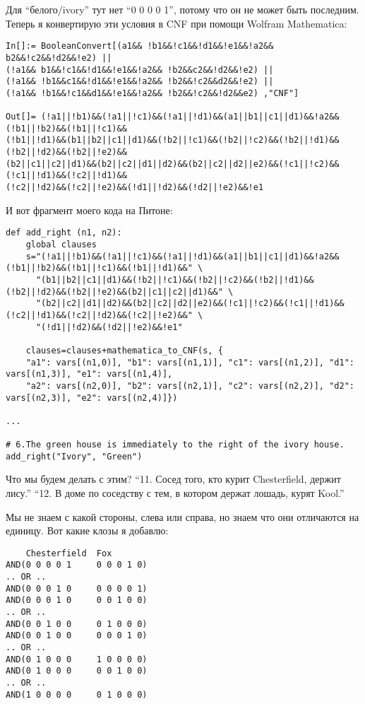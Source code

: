 Для ``белого/ivory'' тут нет ``0 0 0 0 1'', потому что он не может быть последним.
Теперь я конвертирую эти условия в CNF при помощи Wolfram Mathematica:

\begin{lstlisting}
In[]:= BooleanConvert[(a1&& !b1&&!c1&&!d1&&!e1&&!a2&& b2&&!c2&&!d2&&!e2) ||
(!a1&& b1&&!c1&&!d1&&!e1&&!a2&& !b2&&c2&&!d2&&!e2) ||
(!a1&& !b1&&c1&&!d1&&!e1&&!a2&& !b2&&!c2&&d2&&!e2) ||
(!a1&& !b1&&!c1&&d1&&!e1&&!a2&& !b2&&!c2&&!d2&&e2) ,"CNF"]

Out[]= (!a1||!b1)&&(!a1||!c1)&&(!a1||!d1)&&(a1||b1||c1||d1)&&!a2&&(!b1||!b2)&&(!b1||!c1)&&
(!b1||!d1)&&(b1||b2||c1||d1)&&(!b2||!c1)&&(!b2||!c2)&&(!b2||!d1)&&(!b2||!d2)&&(!b2||!e2)&&
(b2||c1||c2||d1)&&(b2||c2||d1||d2)&&(b2||c2||d2||e2)&&(!c1||!c2)&&(!c1||!d1)&&(!c2||!d1)&&
(!c2||!d2)&&(!c2||!e2)&&(!d1||!d2)&&(!d2||!e2)&&!e1
\end{lstlisting}

И вот фрагмент моего кода на Питоне:

\begin{lstlisting}
def add_right (n1, n2):
    global clauses
    s="(!a1||!b1)&&(!a1||!c1)&&(!a1||!d1)&&(a1||b1||c1||d1)&&!a2&&(!b1||!b2)&&(!b1||!c1)&&(!b1||!d1)&&" \
      "(b1||b2||c1||d1)&&(!b2||!c1)&&(!b2||!c2)&&(!b2||!d1)&&(!b2||!d2)&&(!b2||!e2)&&(b2||c1||c2||d1)&&" \
      "(b2||c2||d1||d2)&&(b2||c2||d2||e2)&&(!c1||!c2)&&(!c1||!d1)&&(!c2||!d1)&&(!c2||!d2)&&(!c2||!e2)&&" \
      "(!d1||!d2)&&(!d2||!e2)&&!e1"

    clauses=clauses+mathematica_to_CNF(s, {
	"a1": vars[(n1,0)], "b1": vars[(n1,1)], "c1": vars[(n1,2)], "d1": vars[(n1,3)], "e1": vars[(n1,4)],
	"a2": vars[(n2,0)], "b2": vars[(n2,1)], "c2": vars[(n2,2)], "d2": vars[(n2,3)], "e2": vars[(n2,4)]})

...

# 6.The green house is immediately to the right of the ivory house.
add_right("Ivory", "Green")
\end{lstlisting}

Что мы будем делать с этим?
``11. Сосед того, кто курит Chesterfield, держит лису.''
``12. В доме по соседству с тем, в котором держат лошадь, курят Kool.''

Мы не знаем с какой стороны, слева или справа, но знаем что они отличаются на единицу.
Вот какие клозы я добавлю:

\begin{lstlisting}
    Chesterfield  Fox
AND(0 0 0 0 1     0 0 0 1 0)
.. OR ..
AND(0 0 0 1 0     0 0 0 0 1)
AND(0 0 0 1 0     0 0 1 0 0)
.. OR ..
AND(0 0 1 0 0     0 1 0 0 0)
AND(0 0 1 0 0     0 0 0 1 0)
.. OR ..
AND(0 1 0 0 0     1 0 0 0 0)
AND(0 1 0 0 0     0 0 1 0 0)
.. OR ..
AND(1 0 0 0 0     0 1 0 0 0)
\end{lstlisting}


